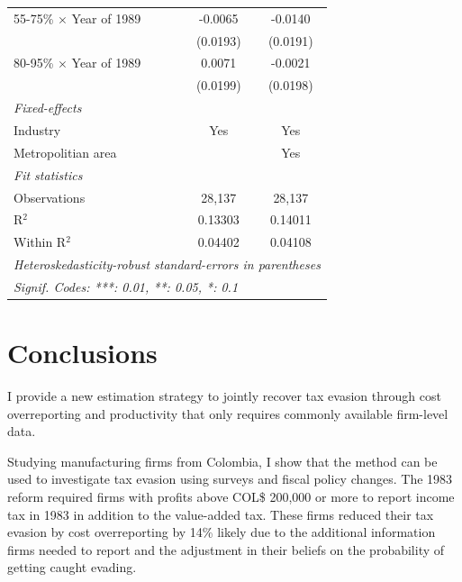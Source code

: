 \documentclass[
  12pt]{article}
\theoremstyle{definition}
\theoremstyle{remark}
\begin{document}
\begin{table}
\begin{tabular}{lcc}
   55-75\% $\times$ Year of 1989   & -0.0065  & -0.0140\\   
                                   & (0.0193) & (0.0191)\\   
   80-95\% $\times$ Year of 1989   & 0.0071   & -0.0021\\   
                                   & (0.0199) & (0.0198)\\   
   \midrule
   \emph{Fixed-effects}\\
   Industry                        & Yes      & Yes\\  
   Metropolitian area              &          & Yes\\  
   \midrule
   \emph{Fit statistics}\\
   Observations                    & 28,137   & 28,137\\  
   R$^2$                           & 0.13303  & 0.14011\\  
   Within R$^2$                    & 0.04402  & 0.04108\\  
   \midrule \midrule
   \multicolumn{3}{l}{\emph{Heteroskedasticity-robust standard-errors in parentheses}}\\
   \multicolumn{3}{l}{\emph{Signif. Codes: ***: 0.01, **: 0.05, *: 0.1}}\\
\end{tabular}
\end{table}

\par\endgroup

\hypertarget{conclusions}{%
\section*{Conclusions}\label{conclusions}}

I provide a new estimation strategy to jointly recover tax evasion
through cost overreporting and productivity that only requires commonly
available firm-level data.

Studying manufacturing firms from Colombia, I show that the method can
be used to investigate tax evasion using surveys and fiscal policy
changes. The 1983 reform required firms with profits above COL\$ 200,000
or more to report income tax in 1983 in addition to the value-added tax.
These firms reduced their tax evasion by cost overreporting by 14\%
likely due to the additional information firms needed to report and the
adjustment in their beliefs on the probability of getting caught
evading.
\end{document}
